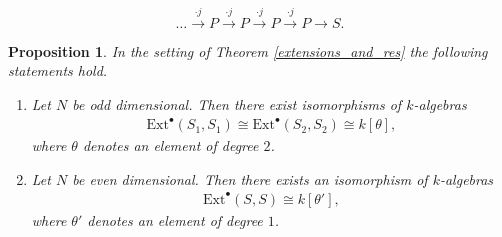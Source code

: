 \documentclass[10pt,a4paper]{amsart}
\newtheorem{proposition}{Proposition}
\begin{document}
        \begin{equation}
            \dots \overset{\cdot j}{\longrightarrow} P \overset{\cdot j}{\longrightarrow} P \overset{\cdot j}{\longrightarrow} P \overset{\cdot j}{\longrightarrow} P \longrightarrow S.
        \end{equation}

\begin{proposition}\label{technical_heart}
   In the setting of Theorem \ref{extensions_and_res} the following statements hold.
    \begin{enumerate}[label=\roman*)]
        \item Let $N$ be odd dimensional. Then there exist isomorphisms of $k$-algebras
        \begin{equation*}
        \begin{aligned}
            \mathrm{Ext}^{\bullet}(S_1,S_1) \cong \mathrm{Ext}^{\bullet}(S_2,S_2)  \cong k[\theta],
        \end{aligned}
    \end{equation*}
    where $\theta$ denotes an element of degree $2$.
    \item Let $N$ be even dimensional. Then there exists an isomorphism of $k$-algebras
        \begin{equation*}
        \begin{aligned}
            \mathrm{Ext}^{\bullet}(S,S) \cong k[\theta'],
        \end{aligned}
    \end{equation*}
    where $\theta'$ denotes an element of degree $1$.
    \end{enumerate}
\end{proposition}
\end{document}
